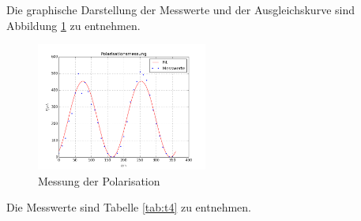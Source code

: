 \noindent Die graphische Darstellung der Messwerte und der Ausgleichskurve sind Abbildung \ref{fig:pol} zu entnehmen.

\begin{figure}[H]
	\centering
	\includegraphics[width=0.5\textwidth]{plots/pol}
	\caption{Messung der Polarisation}
	\label{fig:pol}
\end{figure}

\noindent Die Messwerte sind Tabelle \ref{tab:t4} zu entnehmen.

